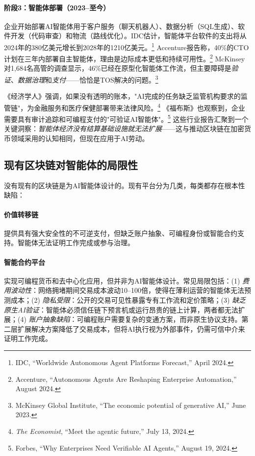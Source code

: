 \documentclass[11pt]{article}
\begin{document}
\paragraph{阶段3：智能体部署（2023--至今）} 企业开始部署AI智能体用于客户服务（聊天机器人）、数据分析（SQL生成）、软件开发（代码审查）和物流（路线优化）。IDC估计，智能体平台软件的支出将从2024年的380亿美元增长到2028年的1210亿美元。\footnote{IDC, ``Worldwide Autonomous Agent Platforms Forecast,'' April 2024.} Accenture报告称，40\%的CTO计划在三年内部署自主智能体，理由是边际成本更低和持续可用性。\footnote{Accenture, ``Autonomous Agents Are Reshaping Enterprise Automation,'' August 2024.} McKinsey对1,684名高管的调查显示，46\%已经在原型化智能体工作流，但主要障碍是\emph{验证}、\emph{数据治理}和\emph{支付}——恰恰是TOS解决的问题。\footnote{McKinsey Global Institute, ``The economic potential of generative AI,'' June 2023.}

《经济学人》强调，如果没有透明的账本，"AI完成的任务缺乏监管机构要求的监管链"，为金融服务和医疗保健部署带来法律风险。\footnote{\emph{The Economist}, ``Meet the agentic future,'' July 13, 2024.} 《福布斯》也观察到，企业需要具有审计追踪和可编程支付的"可验证AI智能体"。\footnote{Forbes, ``Why Enterprises Need Verifiable AI Agents,'' August 19, 2024.} 这些行业报告汇聚到一个关键洞察：\emph{智能体经济没有结算基础设施就无法扩展}——这与推动区块链在加密货币领域采用的认知相同，但现在应用于AI劳动。

\subsection{现有区块链对智能体的局限性}
没有现有的区块链是为AI智能体设计的。现有平台分为几类，每类都存在根本性缺陷：

\paragraph{价值转移链} 提供具有强大安全性的不可逆支付，但缺乏账户抽象、可编程身份或智能合约支持。智能体无法证明工作完成或参与治理。

\paragraph{智能合约平台} 实现可编程货币和去中心化应用，但并非为AI智能体设计。常见局限包括：(1) \emph{费用波动性}：网络拥堵期间交易成本波动10--100倍，使得在薄利运营的智能体无法预测成本；(2) \emph{隐私受限}：公开的交易可见性暴露专有工作流和定价策略；(3) \emph{缺乏原生AI验证}：智能体必须信任链下预言机或运行昂贵的链上计算，两者都无法扩展；(4) \emph{账户抽象缺陷}：可编程账户需要复杂的变通方案，而非原生协议支持。第二层扩展解决方案降低了交易成本，但将AI执行视为外部事件，仍需可信中介来证明工作完成。
\end{document}
